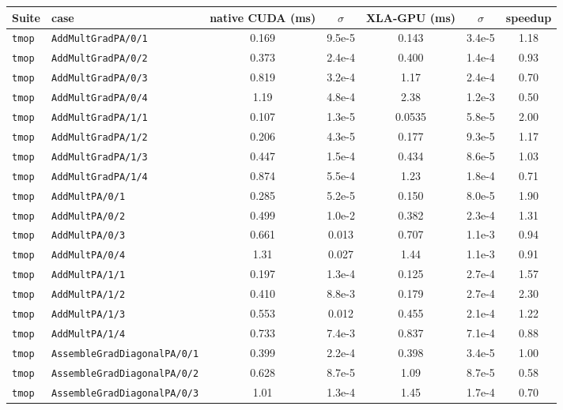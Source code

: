 \begin{tabular}{ll S[table-format=3.4e-1] S[table-format=1.2e-1] S[table-format=3.4e-1] S[table-format=1.2e-1] S[table-format=2.2]}
\toprule
Suite & case & {native CUDA (ms)} & {$\sigma$} & {XLA-GPU (ms)} & {$\sigma$} & {speedup} \\
\midrule
\texttt{tmop} & \texttt{AddMultGradPA/0/1} & 0.169 & 9.5e-5 & 0.143 & 3.4e-5 & 1.18 \\
\texttt{tmop} & \texttt{AddMultGradPA/0/2} & 0.373 & 2.4e-4 & 0.400 & 1.4e-4 & 0.93 \\
\texttt{tmop} & \texttt{AddMultGradPA/0/3} & 0.819 & 3.2e-4 & 1.17 & 2.4e-4 & 0.70 \\
\texttt{tmop} & \texttt{AddMultGradPA/0/4} & 1.19 & 4.8e-4 & 2.38 & 1.2e-3 & 0.50 \\
\texttt{tmop} & \texttt{AddMultGradPA/1/1} & 0.107 & 1.3e-5 & 0.0535 & 5.8e-5 & 2.00 \\
\texttt{tmop} & \texttt{AddMultGradPA/1/2} & 0.206 & 4.3e-5 & 0.177 & 9.3e-5 & 1.17 \\
\texttt{tmop} & \texttt{AddMultGradPA/1/3} & 0.447 & 1.5e-4 & 0.434 & 8.6e-5 & 1.03 \\
\texttt{tmop} & \texttt{AddMultGradPA/1/4} & 0.874 & 5.5e-4 & 1.23 & 1.8e-4 & 0.71 \\
\texttt{tmop} & \texttt{AddMultPA/0/1} & 0.285 & 5.2e-5 & 0.150 & 8.0e-5 & 1.90 \\
\texttt{tmop} & \texttt{AddMultPA/0/2} & 0.499 & 1.0e-2 & 0.382 & 2.3e-4 & 1.31 \\
\texttt{tmop} & \texttt{AddMultPA/0/3} & 0.661 & 0.013 & 0.707 & 1.1e-3 & 0.94 \\
\texttt{tmop} & \texttt{AddMultPA/0/4} & 1.31 & 0.027 & 1.44 & 1.1e-3 & 0.91 \\
\texttt{tmop} & \texttt{AddMultPA/1/1} & 0.197 & 1.3e-4 & 0.125 & 2.7e-4 & 1.57 \\
\texttt{tmop} & \texttt{AddMultPA/1/2} & 0.410 & 8.8e-3 & 0.179 & 2.7e-4 & 2.30 \\
\texttt{tmop} & \texttt{AddMultPA/1/3} & 0.553 & 0.012 & 0.455 & 2.1e-4 & 1.22 \\
\texttt{tmop} & \texttt{AddMultPA/1/4} & 0.733 & 7.4e-3 & 0.837 & 7.1e-4 & 0.88 \\
\texttt{tmop} & \texttt{AssembleGradDiagonalPA/0/1} & 0.399 & 2.2e-4 & 0.398 & 3.4e-5 & 1.00 \\
\texttt{tmop} & \texttt{AssembleGradDiagonalPA/0/2} & 0.628 & 8.7e-5 & 1.09 & 8.7e-5 & 0.58 \\
\texttt{tmop} & \texttt{AssembleGradDiagonalPA/0/3} & 1.01 & 1.3e-4 & 1.45 & 1.7e-4 & 0.70 \\

\end{tabular}

